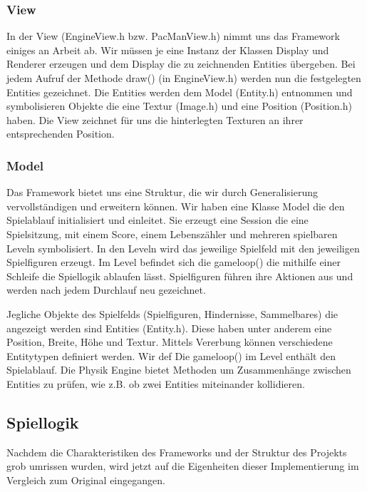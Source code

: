 \documentclass[a4paper, 11pt]{article}
\begin{document}
\subsubsection{View}

In der View (EngineView.h bzw. PacManView.h) nimmt uns das Framework einiges an Arbeit ab. Wir müssen je eine Instanz der Klassen Display und Renderer erzeugen und dem Display die zu zeichnenden Entities übergeben. Bei jedem Aufruf der Methode draw() (in EngineView.h) werden nun die festgelegten Entities gezeichnet. Die Entities werden dem Model (Entity.h) entnommen und symbolisieren Objekte die eine Textur (Image.h) und eine Position (Position.h) haben. Die View zeichnet für uns die hinterlegten Texturen an ihrer entsprechenden Position. 

\subsubsection{Model}

Das Framework bietet uns eine Struktur, die wir durch Generalisierung vervollständigen und erweitern können. Wir haben eine Klasse Model die den Spielablauf initialisiert und einleitet. Sie erzeugt eine Session die eine Spielsitzung, mit einem Score, einem Lebenszähler und mehreren spielbaren Leveln symbolisiert. In den Leveln wird das jeweilige Spielfeld mit den jeweiligen Spielfiguren erzeugt. Im Level befindet sich die gameloop() die mithilfe einer Schleife die Spiellogik ablaufen lässt. Spielfiguren führen ihre Aktionen aus und werden nach jedem Durchlauf neu gezeichnet. 

Jegliche Objekte des Spielfelds (Spielfiguren, Hindernisse, Sammelbares) die angezeigt werden sind Entities (Entity.h). Diese haben unter anderem eine Position, Breite, Höhe und Textur. Mittels Vererbung können verschiedene Entitytypen definiert werden. Wir def Die gameloop() im Level enthält den Spielablauf. Die Physik Engine bietet Methoden um Zusammenhänge zwischen Entities zu prüfen, wie z.B. ob zwei Entities miteinander kollidieren. 

\subsection{Spiellogik}

Nachdem die Charakteristiken des Frameworks und der Struktur des Projekts grob umrissen wurden, wird jetzt auf die Eigenheiten dieser Implementierung im Vergleich zum Original eingegangen. 
\end{document}
